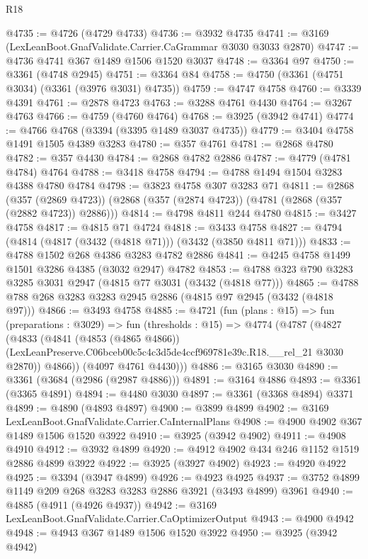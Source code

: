 \begin{lexlean}{R18}
\begin{coremodule}
{{{{{{{{{{{{{{{{{{{@4735 := @4726 (@4729 @4733)
@4736 := @3932 @4735
@4741 := @3169 (LexLeanBoot.GnafValidate.Carrier.CaGrammar @3030 @3033 @2870)
@4747 := @4736 @4741 @367 @1489 @1506 @1520 @3037
@4748 := @3364 @97
@4750 := @3361 (@4748 @2945)
@4751 := @3364 @84
@4758 := @4750 (@3361 (@4751 @3034) (@3361 (@3976 @3031) @4735))
@4759 := @4747 @4758
@4760 := @3339 @4391
@4761 := @2878 @4723
@4763 := @3288 @4761 @4430
@4764 := @3267 @4763
@4766 := @4759 (@4760 @4764)
@4768 := @3925 (@3942 @4741)
@4774 := @4766 @4768 (@3394 (@3395 @1489 @3037 @4735))
@4779 := @3404 @4758 @1491 @1505 @4389 @3283
@4780 := @357 @4761
@4781 := @2868 @4780
@4782 := @357 @4430
@4784 := @2868 @4782 @2886
@4787 := @4779 (@4781 @4784) @4764
@4788 := @3418 @4758
@4794 := @4788 @1494 @1504 @3283 @4388 @4780 @4784
@4798 := @3823 @4758 @307 @3283 @71
@4811 := @2868
    (@357 (@2869 @4723))
    (@2868 (@357 (@2874 @4723)) (@4781 (@2868 (@357 (@2882 @4723)) @2886)))
@4814 := @4798 @4811 @244 @4780
@4815 := @3427 @4758
@4817 := @4815 @71 @4724
@4818 := @3433 @4758
@4827 := @4794 (@4814 (@4817 (@3432 (@4818 @71))) (@3432 (@3850 @4811 @71)))
@4833 := @4788 @1502 @268 @4386 @3283 @4782 @2886
@4841 := @4245 @4758 @1499 @1501 @3286 @4385 (@3032 @2947) @4782
@4853 := @4788 @323 @790 @3283 @3285 @3031 @2947 (@4815 @77 @3031 (@3432 (@4818 @77)))
@4865 := @4788 @788 @268 @3283 @3283 @2945 @2886 (@4815 @97 @2945 (@3432 (@4818 @97)))
@4866 := @3493 @4758
@4885 := @4721
    (fun (plans : @15) =>
    fun (preparations : @3029) =>
    fun (thresholds : @15) =>
    @4774
      (@4787
        (@4827
          (@4833
            (@4841
              (@4853 (@4865 @4866))
              (LexLeanPreserve.C06bceb00c5c4c3d5de4ccf969781e39c.R18.__rel_21 @3030 @2870))
            @4866))
        (@4097 @4761 @4430)))
@4886 := @3165 @3030
@4890 := @3361 (@3684 (@2986 (@2987 @4886)))
@4891 := @3164 @4886
@4893 := @3361 (@3365 @4891)
@4894 := @4480 @3030
@4897 := @3361 (@3368 @4894) @3371
@4899 := @4890 (@4893 @4897)
@4900 := @3899 @4899
@4902 := @3169 LexLeanBoot.GnafValidate.Carrier.CaInternalPlans
@4908 := @4900 @4902 @367 @1489 @1506 @1520 @3922
@4910 := @3925 (@3942 @4902)
@4911 := @4908 @4910
@4912 := @3932 @4899
@4920 := @4912 @4902 @434 @246 @1152 @1519 @2886 @4899 @3922
@4922 := @3925 (@3927 @4902)
@4923 := @4920 @4922
@4925 := @3394 (@3947 @4899)
@4926 := @4923 @4925
@4937 := @3752 @4899 @1149 @209 @268 @3283 @3283 @2886 @3921 (@3493 @4899) @3961
@4940 := @4885 (@4911 (@4926 @4937))
@4942 := @3169 LexLeanBoot.GnafValidate.Carrier.CaOptimizerOutput
@4943 := @4900 @4942
@4948 := @4943 @367 @1489 @1506 @1520 @3922
@4950 := @3925 (@3942 @4942)
}}}}}}}}}}}}}}}}}}}
\end{coremodule}
\end{lexlean}
